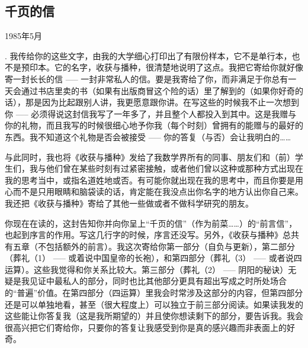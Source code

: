 \documentclass[oneside,12pt]{book}
\begin{document}
\subsection{千页的信}

\hfill 1985年5月

. 我传给你的这些文字，由我的大学细心打印出了有限份样本，它不是单行本，也不是预印本。它的名字，收获与播种，很清楚地说明了这点。我把它寄给你就好像寄一封长长的信 ----- 一封非常私人的信。要是我寄给了你，而非满足于你总有一天会通过书店里卖的书（如果有出版商冒这个险的话）里了解到的（如果你好奇的话），那是因为比起跟别人讲，我更愿意跟你讲。在写这些的时候我不止一次想到你 ----- 必须得说这封信我写了一年多了，并且整个人都投入到其中。这是我赠与你的礼物，而且我写的时候很细心地予你我（每个时刻）曾拥有的能赠与的最好的东西。我不知道这个礼物是否会被接受 ----- 你的答复（与否）会让我明白的……

与此同时，我也将《收获与播种》发给了我数学界所有的同事、朋友们和（前）学生们，我与他们曾在某些时刻有过紧密接触，或者他们曾以这种或那种方式出现在我的思考\footnotemark 当中，或指名道姓地或否。有可能你就出现在我的思考中，而且你要是用心而不是只用眼睛和脑袋读的话，肯定能在我没点出你名字的地方认出你自己来。我还把《收获与播种》寄给了其他一些做或者不做科学研究的朋友。

你现在在读的，这封告知你并向你呈上“千页的信”（作为前菜……）的“前言信”，也起到序言的作用。写这几行字的时候，序言还没写。另外，《收获与播种》总共有五章（不包括额外的前言）。我这次寄给你第一部分（自负与更新），第二部分（葬礼（1） ----- 或着说中国皇帝的长袍），和第四部分（葬礼（3） ----- 或者说四运算）\footnotemark。这些我觉得和你关系比较大。第三部分（葬礼（2） ----- 阴阳的秘诀）无疑是我见证中最私人的部分，同时也比其他部分更具有超出写成之时所处场合的“普遍”价值。在第四部分（四运算）里我会时常涉及这部分的内容，但第四部分还是可以单独地看，甚至（很大程度上）可以独立于前三部分阅读\footnotemark。如果读我发的这些能让你答复我（这是我所期望的）并且使你想读剩下的部分，要告诉我。我会很高兴把它们寄给你，只要你的答复让我感受到你是真的感兴趣而非表面上的好奇。
\addtocounter{footnote}{-1}
\addtocounter{footnote}{1}
\end{document}

